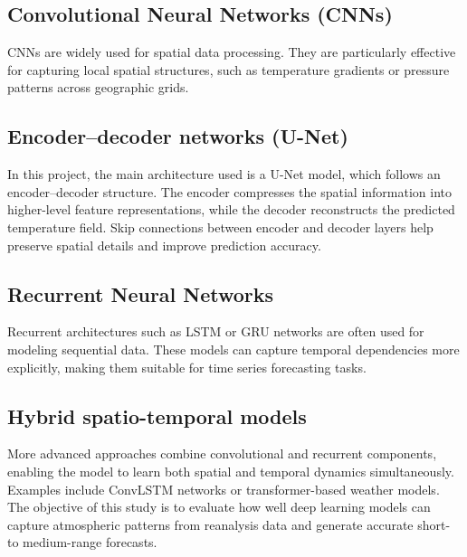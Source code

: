 \subsection{Convolutional Neural Networks (CNNs)}
CNNs are widely used for spatial data processing. They are particularly effective for capturing local spatial structures, such as temperature gradients or pressure patterns across geographic grids.
\subsection{Encoder–decoder networks (U-Net)}
In this project, the main architecture used is a U-Net model, which follows an encoder–decoder structure. The encoder compresses the spatial information into higher-level feature representations, while the decoder reconstructs the predicted temperature field. Skip connections between encoder and decoder layers help preserve spatial details and improve prediction accuracy.
\subsection{Recurrent Neural Networks}
Recurrent architectures such as LSTM or GRU networks are often used for modeling sequential data. These models can capture temporal dependencies more explicitly, making them suitable for time series forecasting tasks.
\subsection{Hybrid spatio-temporal models}
More advanced approaches combine convolutional and recurrent components, enabling the model to learn both spatial and temporal dynamics simultaneously. Examples include ConvLSTM networks or transformer-based weather models.
The objective of this study is to evaluate how well deep learning models can capture atmospheric patterns from reanalysis data and generate accurate short- to medium-range forecasts.

